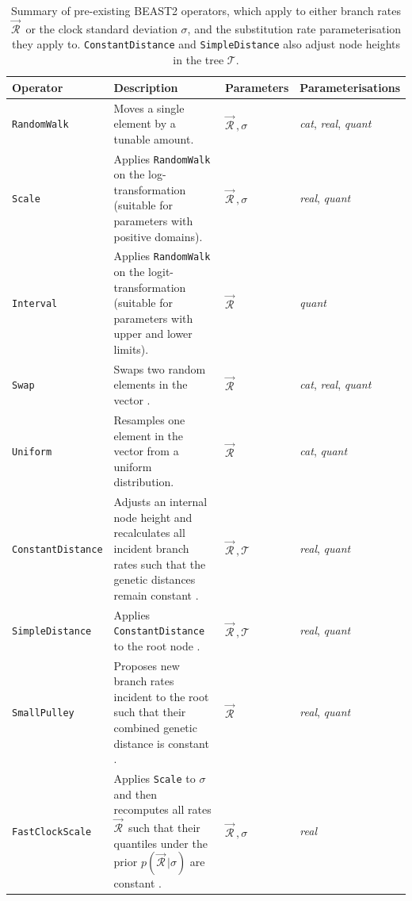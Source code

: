 \documentclass[10pt,letterpaper]{article}
\begin{document}
\begin{table}[h!]
\centering
\begin{tabular}{|l p{4.2cm} l l|} 
 \hline
 Operator & Description & Parameters & Parameterisations  \\
  \hline
 \texttt{RandomWalk} & Moves a single element by a tunable amount. & $\vec{\mathcal{R}}^{\,}, \sigma$ & \textit{cat}, \textit{real}, \textit{quant} \\
  \hline
\texttt{Scale} & Applies \texttt{RandomWalk} on the log-transformation (suitable for parameters with positive domains). & $\vec{\mathcal{R}}^{\,}, \sigma$ & \textit{real}, \textit{quant}  \\
  \hline
 \texttt{Interval} & Applies \texttt{RandomWalk} on the logit-transformation (suitable for parameters with upper and lower limits). & $\vec{\mathcal{R}}^{\,}$ & \textit{quant}  \\
  \hline
 \texttt{Swap} & Swaps two random elements in the vector \cite{drummond2006relaxed}. & $\vec{\mathcal{R}}^{\,}$  & \textit{cat}, \textit{real}, \textit{quant}  \\
 \hline
\texttt{Uniform} & Resamples one element in the vector from a uniform distribution. & $\vec{\mathcal{R}}^{\,}$  & \textit{cat}, \textit{quant}  \\
 \hline
\texttt{ConstantDistance} & Adjusts an internal node height and recalculates all incident branch rates such that the genetic distances remain constant \cite{zhang2020improving}.  & $\vec{\mathcal{R}}^{\,}, \mathcal{T}$ & \textit{real}, \textit{quant} \\
 \hline
\texttt{SimpleDistance} & Applies \texttt{ConstantDistance} to the root node \cite{zhang2020improving}.  & $\vec{\mathcal{R}}^{\,}, \mathcal{T}$ & \textit{real}, \textit{quant} \\
 \hline
\texttt{SmallPulley} & Proposes new branch rates incident to the root such that their combined genetic distance is constant  \cite{zhang2020improving}.  & $\vec{\mathcal{R}}^{\,}$ & \textit{real}, \textit{quant} \\
 \hline
\texttt{FastClockScale} & Applies \texttt{Scale} to $\sigma$ and then recomputes all rates $\vec{\mathcal{R}}^{\,}$ such that their quantiles under the prior $p(\vec{\mathcal{R}}^{\,}|\sigma)$ are constant \cite{zhang2020improving}.  & $\vec{\mathcal{R}}^{\,}, \sigma$ & \textit{real} \\
 \hline
\end{tabular}
\caption{Summary of pre-existing BEAST2 operators, which apply to either branch rates $\vec{\mathcal{R}}^{\,}$ or the clock standard deviation $\sigma$, and the substitution rate parameterisation they apply to.
 \texttt{ConstantDistance} and \texttt{SimpleDistance} also adjust node heights in the tree $\mathcal{T}$. }
\label{table:kernels}
\end{table}
\end{document}
